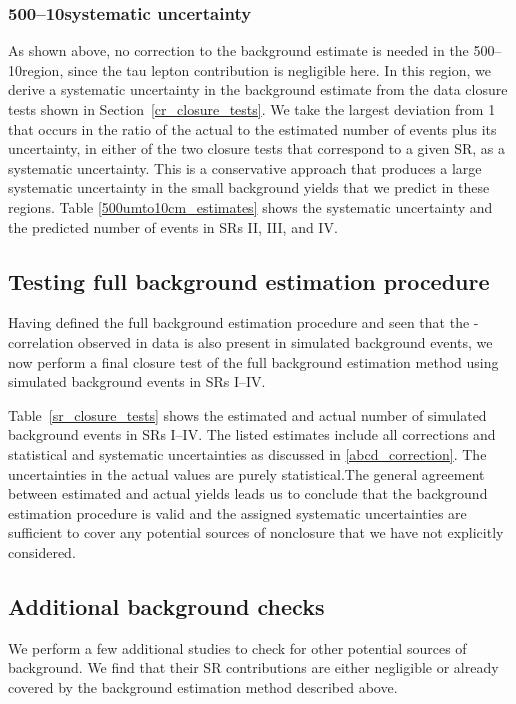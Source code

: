 

\subsubsection{500\mum--10\cm systematic uncertainty}
As shown above, no correction to the background estimate is needed in the 500\mum--10\cm region, since the tau lepton contribution is negligible here. In this region, we derive a systematic uncertainty in the background estimate from the data closure tests shown in Section~\ref{cr_closure_tests}. We take the largest deviation from 1 that occurs in the ratio of the actual to the estimated number of events plus its uncertainty, in either of the two closure tests that correspond to a given SR, as a systematic uncertainty. This is a conservative approach that produces a large systematic uncertainty in the small background yields that we predict in these regions. Table \ref{500umto10cm_estimates} shows the systematic uncertainty and the predicted number of events in SRs II, III, and IV.



\subsection{Testing full background estimation procedure}

Having defined the full background estimation procedure and seen that the \ada-\adb correlation observed in data is also present in simulated background events, we now perform a final closure test of the full background estimation method using simulated background events in SRs I--IV.

Table~\ref{sr_closure_tests} shows the estimated and actual number of simulated background events in SRs I--IV. The listed estimates include all corrections and statistical and systematic uncertainties as discussed in \ref{abcd_correction}. The uncertainties in the actual values are purely statistical.The general agreement between estimated and actual yields leads us to conclude that the background estimation procedure is valid and the assigned systematic uncertainties are sufficient to cover any potential sources of nonclosure that we have not explicitly considered.



\subsection{Additional background checks}
\label{additional_bg_checks}
We perform a few additional studies to check for other potential sources of background. We find that their SR contributions are either negligible or already covered by the background estimation method described above.

